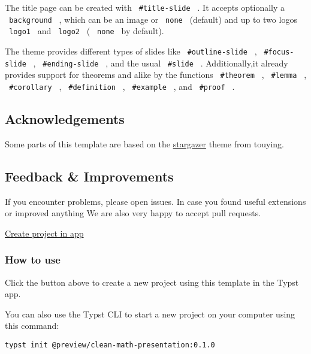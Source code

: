 The title page can be created with \texttt{\ \#title-slide\ } . It
accepts optionally a \texttt{\ background\ } , which can be an image or
\texttt{\ none\ } (default) and up to two logos \texttt{\ logo1\ } and
\texttt{\ logo2\ } ( \texttt{\ none\ } by default).

The theme provides different types of slides like
\texttt{\ \#outline-slide\ } , \texttt{\ \#focus-slide\ } ,
\texttt{\ \#ending-slide\ } , and the usual \texttt{\ \#slide\ } .
Additionally,it already provides support for theorems and alike by the
functions \texttt{\ \#theorem\ } , \texttt{\ \#lemma\ } ,
\texttt{\ \#corollary\ } , \texttt{\ \#definition\ } ,
\texttt{\ \#example\ } , and \texttt{\ \#proof\ } .

\subsection{Acknowledgements}\label{acknowledgements}

Some parts of this template are based on the
\href{https://github.com/touying-typ/touying/blob/main/themes/stargazer.typ}{stargazer}
theme from touying.

\subsection{Feedback \& Improvements}\label{feedback-improvements}

If you encounter problems, please open issues. In case you found useful
extensions or improved anything We are also very happy to accept pull
requests.

\href{/app?template=clean-math-presentation&version=0.1.0}{Create
project in app}

\subsubsection{How to use}\label{how-to-use}

Click the button above to create a new project using this template in
the Typst app.

You can also use the Typst CLI to start a new project on your computer
using this command:

\begin{verbatim}
typst init @preview/clean-math-presentation:0.1.0
\end{verbatim}



